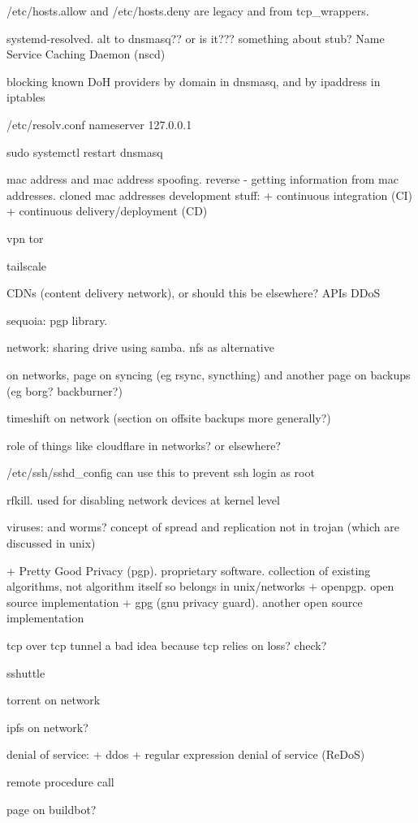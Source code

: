 /etc/hosts.allow and /etc/hosts.deny are legacy and from tcp\_wrappers.

systemd-resolved. alt to dnsmasq?? or is it??? something about stub?
Name Service Caching Daemon (nscd)


blocking known DoH providers by domain in dnsmasq, and by ipaddress in iptables


/etc/resolv.conf
nameserver 127.0.0.1

sudo systemctl restart dnsmasq

mac address and mac address spoofing. reverse - getting information from mac addresses. cloned mac addresses
development stuff:
+ continuous integration (CI)
+ continuous delivery/deployment (CD)

vpn
tor

tailscale

CDNs (content delivery network), or should this be elsewhere?
APIs
DDoS

sequoia: pgp library.

network: sharing drive using samba. nfs as alternative

on networks, page on syncing (eg rsync, syncthing) and another page on backups (eg borg? backburner?)

timeshift on network (section on offsite backups more generally?)

role of things like cloudflare in networks? or elsewhere?

/etc/ssh/sshd\_config
can use this to prevent ssh login as root

rfkill. used for disabling network devices at kernel level

viruses: and worms? concept of spread and replication not in trojan (which are discussed in unix)

+ Pretty Good Privacy (pgp). proprietary software. collection of existing algorithms, not algorithm itself so belongs in unix/networks
+ openpgp. open source implementation
+ gpg (gnu privacy guard). another open source implementation

tcp over tcp tunnel a bad idea because tcp relies on loss? check?

sshuttle

torrent on network

ipfs on network?

denial of service:
+ ddos
+ regular expression denial of service (ReDoS)

remote procedure call

page on buildbot?

